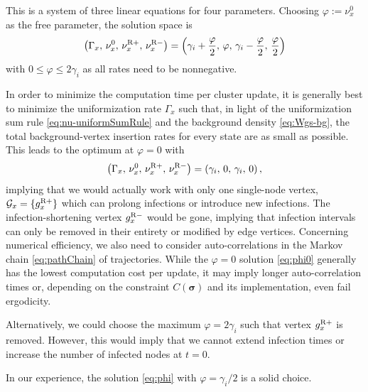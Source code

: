 \documentclass[english,10pt,aps,pra,twocolumn,superscriptaddress,floatfix,fleqn]{revtex4-2}
\newcommand{\mc}[1]{\mathcal{#1}}
\renewcommand{\vec}[1]{{\boldsymbol{#1}}}
\newcommand{\G} {\mc{G}}
\newcommand{\vs}{\vec{\sigma}}
\newcommand{\tR}{\textnormal{R}}
\begin{document}
This is a system of three linear equations for four parameters. Choosing $\varphi:=\nu^{0}_x$ as the free parameter, the solution space is
\begin{equation}\label{eq:phi}
	\left(\Gamma_x,\,\nu^{0}_x,\,\nu^{\tR+}_x,\,\nu^{\tR-}_x\right)
	=\left(\gamma_i+\frac{\varphi}{2},\,\varphi,\,\gamma_i-\frac{\varphi}{2},\,\frac{\varphi}{2}\right)
\end{equation}
with $0\leq\varphi\leq 2\gamma_i$ as all rates need to be nonnegative.

In order to minimize the computation time per cluster update, it is generally best to minimize the uniformization rate $\Gamma_x$ such that, in light of the uniformization sum rule \eqref{eq:nu-uniformSumRule} and the background density \eqref{eq:Wgs-bg}, the total background-vertex insertion rates for every state are as small as possible. This leads to the optimum at $\varphi=0$ with
\begin{equation}\label{eq:phi0}
	\left(\Gamma_x,\,\nu^{0}_x,\,\nu^{\tR+}_x,\,\nu^{\tR-}_x\right)
	=\left(\gamma_i,\,0,\,\gamma_i,\,0\right),
\end{equation}
implying that we would actually work with only one single-node vertex, $\G_x=\{g^{\tR+}_x\}$ which can prolong infections or introduce new infections. The infection-shortening vertex $g^{\tR-}_x$ would be gone, implying that infection intervals can only be removed in their entirety or modified by edge vertices.
Concerning numerical efficiency, we also need to consider auto-correlations in the Markov chain \eqref{eq:pathChain} of trajectories. While the $\varphi=0$ solution \eqref{eq:phi0} generally has the lowest computation cost per update, it may imply longer auto-correlation times or, depending on the constraint $C(\vs)$ and its implementation, even fail ergodicity.

Alternatively, we could choose the maximum $\varphi=2\gamma_i$ such that vertex $g^{\tR+}_x$ is removed. However, this would imply that we cannot extend infection times or increase the number of infected nodes at $t=0$.

In our experience, the solution \eqref{eq:phi} with $\varphi=\gamma_i/2$ is a solid choice.
\end{document}
